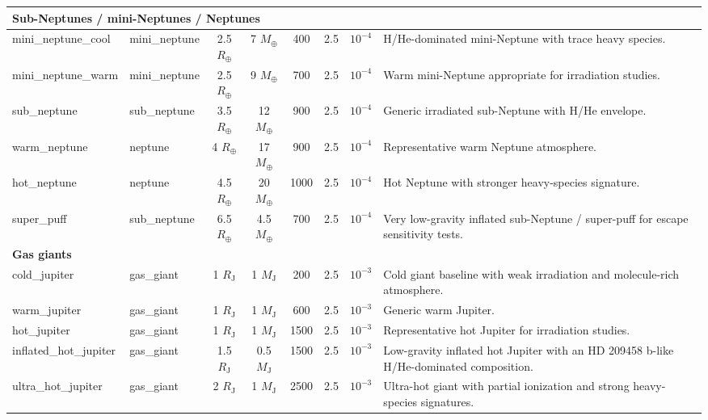 \begin{longtable}{llcccccl}
\multicolumn{8}{l}{\textbf{Sub-Neptunes / mini-Neptunes / Neptunes}} \\
\midrule
mini\_neptune\_cool & mini\_neptune & 2.5 $R_\oplus$ & 7 $M_\oplus$ & 400 & 2.5 & $10^{-4}$ & H/He-dominated mini-Neptune with trace heavy species. \\
mini\_neptune\_warm & mini\_neptune & 2.5 $R_\oplus$ & 9 $M_\oplus$ & 700 & 2.5 & $10^{-4}$ & Warm mini-Neptune appropriate for irradiation studies. \\
sub\_neptune & sub\_neptune & 3.5 $R_\oplus$ & 12 $M_\oplus$ & 900 & 2.5 & $10^{-4}$ & Generic irradiated sub-Neptune with H/He envelope. \\
warm\_neptune & neptune & 4 $R_\oplus$ & 17 $M_\oplus$ & 900 & 2.5 & $10^{-4}$ & Representative warm Neptune atmosphere. \\
hot\_neptune & neptune & 4.5 $R_\oplus$ & 20 $M_\oplus$ & 1000 & 2.5 & $10^{-4}$ & Hot Neptune with stronger heavy-species signature. \\
super\_puff & sub\_neptune & 6.5 $R_\oplus$ & 4.5 $M_\oplus$ & 700 & 2.5 & $10^{-4}$ & Very low-gravity inflated sub-Neptune / super-puff for escape sensitivity tests. \\
\midrule

\multicolumn{8}{l}{\textbf{Gas giants}} \\
\midrule
cold\_jupiter & gas\_giant & 1 $R_\mathrm{J}$ & 1 $M_\mathrm{J}$ & 200 & 2.5 & $10^{-3}$ & Cold giant baseline with weak irradiation and molecule-rich atmosphere. \\
warm\_jupiter & gas\_giant & 1 $R_\mathrm{J}$ & 1 $M_\mathrm{J}$ & 600 & 2.5 & $10^{-3}$ & Generic warm Jupiter. \\
hot\_jupiter & gas\_giant & 1 $R_\mathrm{J}$ & 1 $M_\mathrm{J}$ & 1500 & 2.5 & $10^{-3}$ & Representative hot Jupiter for irradiation studies. \\
inflated\_hot\_jupiter & gas\_giant & 1.5 $R_\mathrm{J}$ & 0.5 $M_\mathrm{J}$ & 1500 & 2.5 & $10^{-3}$ & Low-gravity inflated hot Jupiter with an HD 209458 b-like H/He-dominated composition. \\
ultra\_hot\_jupiter & gas\_giant & 2 $R_\mathrm{J}$ & 1 $M_\mathrm{J}$ & 2500 & 2.5 & $10^{-3}$ & Ultra-hot giant with partial ionization and strong heavy-species signatures. \\
\midrule

\end{longtable}

